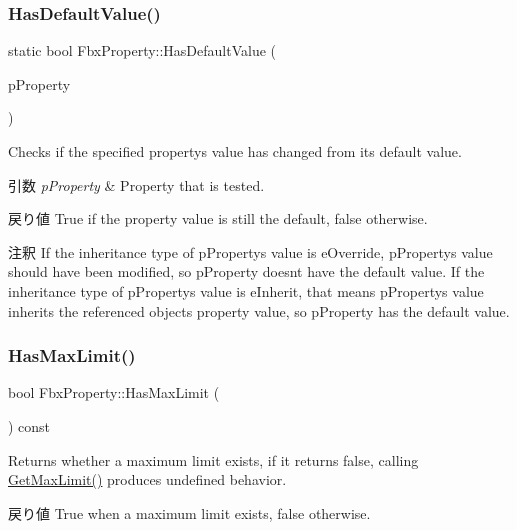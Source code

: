 \subsubsection{\texorpdfstring{Has\+Default\+Value()}{HasDefaultValue()}}
{\footnotesize\ttfamily static bool Fbx\+Property\+::\+Has\+Default\+Value (\begin{DoxyParamCaption}\item[{\hyperlink{class_fbx_property}{Fbx\+Property} \&}]{p\+Property }\end{DoxyParamCaption})\hspace{0.3cm}{\ttfamily [static]}}

Checks if the specified property\textquotesingle{}s value has changed from its default value. 
\begin{DoxyParams}{引数}
{\em p\+Property} & Property that is tested. \\
\hline
\end{DoxyParams}
\begin{DoxyReturn}{戻り値}
{\ttfamily True} if the property value is still the default, {\ttfamily false} otherwise. 
\end{DoxyReturn}
\begin{DoxyRemark}{注釈}
If the inheritance type of p\+Property\textquotesingle{}s value is e\+Override, p\+Property\textquotesingle{}s value should have been modified, so p\+Property doesn\textquotesingle{}t have the default value. If the inheritance type of p\+Property\textquotesingle{}s value is e\+Inherit, that means p\+Property\textquotesingle{}s value inherits the referenced object\textquotesingle{}s property value, so p\+Property has the default value. 
\end{DoxyRemark}
\mbox{\label{class_fbx_property_a0f55c44acd2069128f85063eb2c04d47}} 
\subsubsection{\texorpdfstring{Has\+Max\+Limit()}{HasMaxLimit()}}
{\footnotesize\ttfamily bool Fbx\+Property\+::\+Has\+Max\+Limit (\begin{DoxyParamCaption}{ }\end{DoxyParamCaption}) const}

Returns whether a maximum limit exists, if it returns false, calling \hyperlink{class_fbx_property_a1cdf4161465d3b988b23b9fe05fa22b4}{Get\+Max\+Limit()} produces undefined behavior. \begin{DoxyReturn}{戻り値}
{\ttfamily True} when a maximum limit exists, {\ttfamily false} otherwise. 
\end{DoxyReturn}
\mbox{\label{class_fbx_property_ae2c3f0688ecfbed568feb2dbe33967c3}} 
